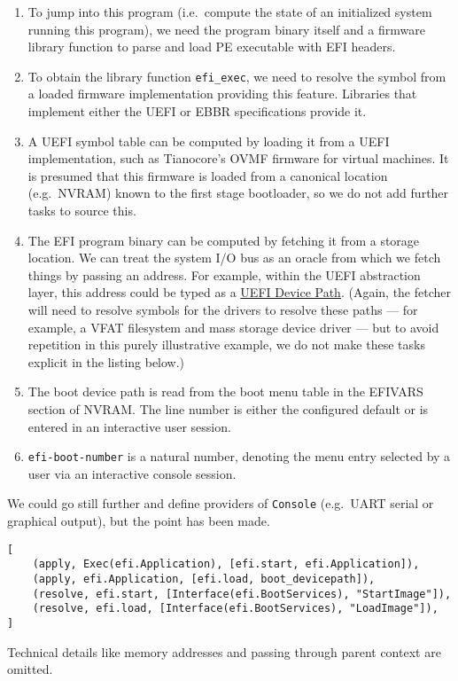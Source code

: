 \begin{enumerate}
\def\labelenumi{\arabic{enumi}.}
\tightlist
\item
  To jump into this program (i.e.~compute the state of an initialized
  system running this program), we need the program binary itself and a
  firmware library function to parse and load PE executable with EFI
  headers.
\item
  To obtain the library function \texttt{efi\_exec}, we need to resolve
  the symbol from a loaded firmware implementation providing this
  feature. Libraries that implement either the UEFI or EBBR
  specifications provide it.
\item
  A UEFI symbol table can be computed by loading it from a UEFI
  implementation, such as Tianocore's OVMF firmware for virtual
  machines. It is presumed that this firmware is loaded from a canonical
  location (e.g.~NVRAM) known to the first stage bootloader, so we do
  not add further tasks to source this.
\item
  The EFI program binary can be computed by fetching it from a storage
  location. We can treat the system I/O bus as an oracle from which we
  fetch things by passing an address. For example, within the UEFI
  abstraction layer, this address could be typed as a
  \href{https://uefi.org/specs/UEFI/2.10/10_Protocols_Device_Path_Protocol.html}{UEFI
  Device Path}. (Again, the fetcher will need to resolve symbols for the
  drivers to resolve these paths --- for example, a VFAT filesystem and
  mass storage device driver --- but to avoid repetition in this purely
  illustrative example, we do not make these tasks explicit in the
  listing below.)
\item
  The boot device path is read from the boot menu table in the EFIVARS
  section of NVRAM. The line number is either the configured default or
  is entered in an interactive user session.
\item
  \texttt{efi-boot-number} is a natural number, denoting the menu entry
  selected by a user via an interactive console session.
\end{enumerate}

We could go still further and define providers of \texttt{Console} (e.g.~UART serial or graphical output), but the point has been made.

\begin{verbatim}
[
    (apply, Exec(efi.Application), [efi.start, efi.Application]),
    (apply, efi.Application, [efi.load, boot_devicepath]),
    (resolve, efi.start, [Interface(efi.BootServices), "StartImage"]),
    (resolve, efi.load, [Interface(efi.BootServices), "LoadImage"]),
]
\end{verbatim}
Technical details like memory addresses and passing through parent context are omitted.


